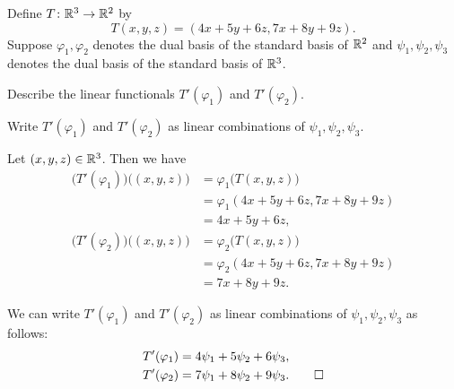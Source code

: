 \begin{exercise}
Define $T\colon\mathbb{R}^3\to\mathbb{R}^2$ by
\[ T(x,y,z) = (4x+5y+6z,7x+8y+9z). \]
Suppose $\varphi_1,\varphi_2$ denotes the dual basis of the standard basis of
$\mathbb{R}^2$ and $\psi_1,\psi_2,\psi_3$ denotes the dual basis of the standard basis
of $\mathbb{R}^3$.
\begin{parts}
\item Describe the linear functionals $T'(\varphi_1)$ and $T'(\varphi_2)$.
\item Write $T'(\varphi_1)$ and $T'(\varphi_2)$ as linear combinations of
  $\psi_1,\psi_2,\psi_3$.
\end{parts}
\end{exercise}
\begin{solution}\leavevmode
\begin{parts}
\item Let $(x,y,z)\in\mathbb{R}^3$. Then we have
  \begin{align*}
  \bigl(T'(\varphi_1)\bigr)\bigl((x,y,z)\bigr)
   &= \varphi_1\bigl(T(x,y,z)\bigr)\\
   &= \varphi_1(4x+5y+6z,7x+8y+9z)\\
   &= 4x+5y+6z,\\
  \bigl(T'(\varphi_2)\bigr)\bigl((x,y,z)\bigr)
   &= \varphi_2\bigl(T(x,y,z)\bigr)\\
   &= \varphi_2(4x+5y+6z,7x+8y+9z)\\
   &= 7x+8y+9z.
  \end{align*}
\item We can write $T'(\varphi_1)$ and $T'(\varphi_2)$ as linear combinations
  of $\psi_1,\psi_2,\psi_3$ as follows:
  \begin{align*}
  T'(\varphi_1) &= 4\psi_1+5\psi_2+6\psi_3,\\
  T'(\varphi_2) &= 7\psi_1+8\psi_2+9\psi_3. \qedhere
  \end{align*}
\end{parts}
\end{solution}

